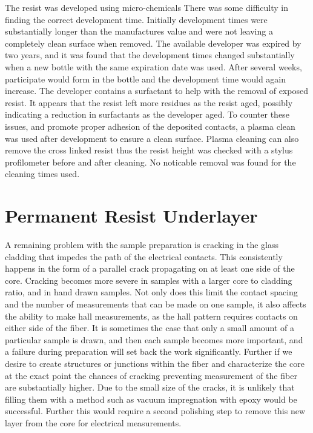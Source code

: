  The resist was developed using micro-chemicals 
 There was some difficulty in finding the correct development time. Initially development times were substantially longer than the manufactures value and were not leaving a completely clean surface when removed. The available developer was expired by two years, and it was found that the development times changed substantially when a new bottle with the same expiration date was used. After several weeks, participate would form in the bottle and the development time would again increase. The developer contains a surfactant to help with the removal of exposed resist. It appears that the resist left more residues as the resist aged, possibly indicating a reduction in surfactants as the developer aged. To counter these issues, and promote proper adhesion of the deposited contacts, a plasma clean was used after development to ensure a clean surface. Plasma cleaning can also remove the cross linked resist thus the resist height was checked with a stylus profilometer before and after cleaning. No noticable removal was found for the cleaning times used. 
 \FloatBarrier
\section{Permanent Resist Underlayer}
A remaining problem with the sample preparation is cracking in the glass cladding that impedes the path of the electrical contacts. This consistently happens in the form of a parallel crack propagating on at least one side of the core. Cracking becomes more severe in samples with a larger core to cladding ratio, and in hand drawn samples. Not only does this limit the contact spacing and the number of measurements that can be made on one sample, it also affects the ability to make hall measurements, as the hall pattern requires contacts on either side of the fiber. It is sometimes the case that only a small amount of a particular sample is drawn, and then each sample becomes more important, and a failure during preparation will set back the work significantly. Further if we desire to create structures or junctions within the fiber and characterize the core at the exact point the chances of cracking preventing measurement of the fiber are substantially higher. Due to the small size of the cracks, it is unlikely that filling them with a method such as vacuum impregnation with epoxy would be successful. Further this would require a second polishing step to remove this new layer from the core for electrical measurements.

